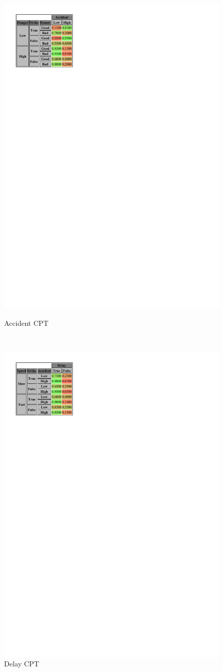 \documentclass[a4paper,12pt]{article} %
\begin{document}
\begin{figure}[H]
	\centering
	\begin{minipage}[c]{.45\textwidth}
		\centering
		\includegraphics[width=.8\linewidth]{../code/accident.pdf}	
		\caption*{Accident CPT}
		\label{fig:accident}
	\end{minipage}
	~
	\begin{minipage}[c]{.45\textwidth}
		\centering
		\includegraphics[width=.8\linewidth]{../code/delay.pdf}	
		\caption*{Delay CPT}
		\label{fig:delay}
	\end{minipage}
\end{figure}
\end{document}
